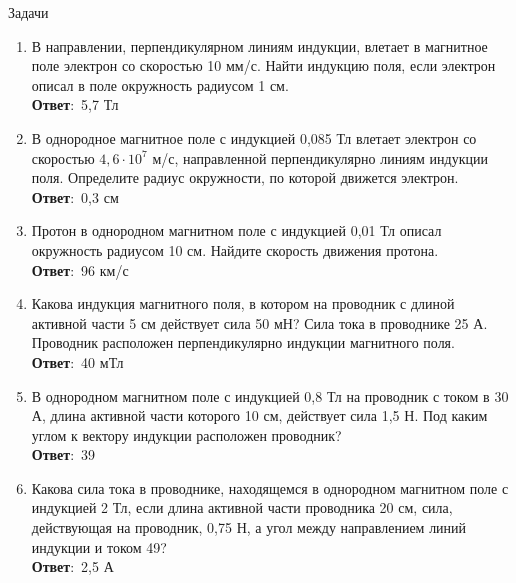 \documentclass[a6paper, 11pt]{diss_4}
\renewcommand{\'}{\,'}
\begin{document}
\begin{center}
   Задачи
\end{center}
\begin{enumerate}
\item В направлении, перпендикулярном линиям индукции, влетает в магнитное поле электрон со скоростью 10 мм/с. Найти индукцию поля, если электрон описал в поле окружность радиусом 1 см.
\\\textbf{Ответ}:\ 5,7 Тл

\item В однородное магнитное поле с индукцией 0,085 Тл влетает электрон со скоростью $4,6\cdot10^7$ м/с, направленной перпендикулярно линиям индукции поля. Определите радиус окружности, по которой движется электрон.
\\\textbf{Ответ}:\ 0,3 см

\item Протон в однородном магнитном поле с индукцией 0,01 Тл описал окружность радиусом 10 см. Найдите скорость движения протона.
\\\textbf{Ответ}:\ 96 км/с

\item Какова индукция магнитного поля, в котором на проводник с длиной активной части 5 см действует сила 50 мН? Сила тока в проводнике 25 А. Проводник расположен перпендикулярно индукции магнитного поля.
\\\textbf{Ответ}:\ 40 мТл

\item В однородном магнитном поле с индукцией 0,8 Тл на проводник с током в 30 А, длина активной части которого 10 см, действует сила 1,5 Н. Под каким углом к вектору индукции расположен проводник?
\\\textbf{Ответ}:\ 39\textdegree
\item Какова сила тока в проводнике, находящемся в однородном магнитном поле с индукцией 2 Тл, если длина активной части проводника 20 см, сила, действующая на проводник, 0,75 Н, а угол между направлением линий индукции и током 49\textdegree?
\\\textbf{Ответ}:\ 2,5 А
\end{enumerate}
\end{document}
